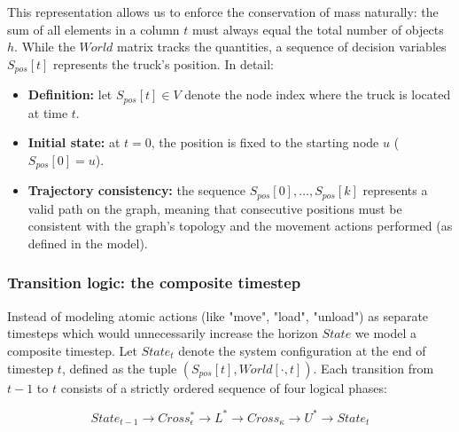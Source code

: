 \documentclass[a4paper,12pt]{article}
\begin{document}
This representation allows us to enforce the conservation of mass naturally: the sum of all elements in a column $t$ must always equal the total number of objects $h$. While the $World$ matrix tracks the quantities, a sequence of decision variables $S_{pos}[t]$ represents the truck's position. In detail:
\begin{itemize}
    \item \textbf{Definition:} let $S_{pos}[t] \in V$ denote the node index where the truck is located at time $t$.
    \item \textbf{Initial state:} at $t=0$, the position is fixed to the starting node $u$ ($S_{pos}[0] = u$).
    \item \textbf{Trajectory consistency:} the sequence $S_{pos}[0], \dots, S_{pos}[k]$ represents a valid path on the graph, meaning that consecutive positions must be consistent with the graph's topology and the movement actions performed (as defined in the model).
\end{itemize}

\subsubsection{Transition logic: the composite timestep}
Instead of modeling atomic actions (like "move", "load", "unload") as separate timesteps which would unnecessarily increase the horizon $State$ we model a composite timestep. Let $State_t$ denote the system configuration at the end of timestep $t$, defined as the tuple $(S_{pos}[t], World[\cdot, t])$. Each transition from $t-1$ to $t$ consists of a strictly ordered sequence of four logical phases:

$$State_{t-1} \xrightarrow{} Cross_{\epsilon}^* \xrightarrow{} L^* \xrightarrow{} Cross_{\kappa} \xrightarrow{} U^* \xrightarrow{} State_{t}$$
\end{document}
